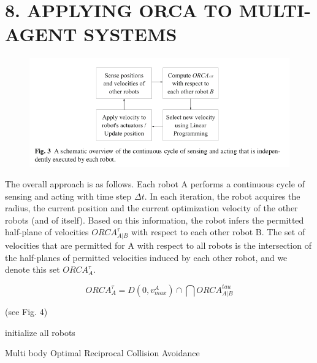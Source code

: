 \documentclass[12pt]{report}
\begin{document}
\chapter*{8. APPLYING ORCA TO MULTI-AGENT SYSTEMS}
\renewcommand{\thefigure}{3}
\begin{figure}[h]
	\centering
	\includegraphics[scale=0.6]{n-body.png}  \label{fig:n-body}
\end{figure}
The overall approach is as follows. Each robot A performs a continuous cycle of sensing and acting with time step $\Delta t$. In each iteration, the robot acquires the radius,
the current position and the current optimization velocity of the other robots (and
of itself). Based on this information, the robot infers the permitted half-plane of
velocities $ORCA^{\tau}_{A|B}$ with respect to each other robot B. The set of velocities that are permitted for A with respect to all robots is the intersection of the half-planes of permitted velocities induced by each other robot, and we denote this set $ORCA^{\tau}_{A}$.

\begin{equation}\label{eq:update}
ORCA^{\tau}_{A} = D(0,v^{A}_{max}) \cap \bigcap ORCA^{tau}_{A|B} \tag{6}
\end{equation}

(see Fig. 4)
\begin{algorithm}[h]
\SetAlgoLined
 initialize all robots\;
 \caption{Multi body Optimal Reciprocal Collision Avoidance}\label{alg:ORCA}
\end{algorithm}
\end{document}
